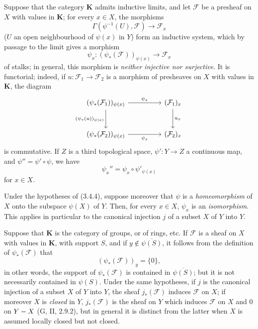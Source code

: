 \begin{env}[3.4.4]
\label{0.3.4.4}
Suppose that the category $\boldsymbol{K}$ admits inductive limits, and let
$\mathcal{F}$ be a presheaf on $X$ with values in $\boldsymbol{K}$; for every
$x\in X$, the morphisms
\[
  \Gamma(\psi^{-1}(U),\mathcal{F})\to\mathcal{F}_x
\]
($U$ an open neighbourhood of $\psi(x)$ in $Y$) form an inductive system, which
by passage
to the limit gives a morphism
\[
  \psi_x:(\psi_*(\mathcal{F}))_{\psi(x)}\to\mathcal{F}_x
\]
of stalks; in general, this morphism is \emph{neither injective nor surjective}.
It is functorial; indeed, if
$u:\mathcal{F}_1\to\mathcal{F}_2$ is a morphism of presheaves on $X$ with
values in $\boldsymbol{K}$, the diagram
\[
\begin{tikzcd}[column sep=huge,row sep=large]
(\psi_*(\mathcal{F}_1))_{\psi(x)}
  \arrow[r,"\psi_x"] \arrow[d,"{(\psi_*(u))_{\psi(x)}}"']
  & (\mathcal{F}_1)_x \arrow[d,"u_x"] \\
(\psi_*(\mathcal{F}_2))_{\psi(x)}
  \arrow[r,"\psi_x"']
  & (\mathcal{F}_2)_x
\end{tikzcd}
\]
is commutative. If $Z$ is a third topological space,
$\psi':Y\to Z$ a continuous map, and $\psi''=\psi'\circ\psi$, we have
\[
  \psi_x''=\psi_x\circ\psi'_{\psi(x)}
\]
for $x\in X$.
\end{env}

\begin{env}[3.4.5]
\label{0.3.4.5}
Under the hypotheses of (3.4.4), suppose moreover that $\psi$ is a
\emph{homeomorphism} of $X$ onto the subspace $\psi(X)$ of $Y$. Then, for
every $x\in X$, $\psi_x$ is an \emph{isomorphism}. This applies in
particular to the canonical injection $j$ of a subset $X$ of $Y$ into $Y$.
\end{env}

\begin{env}[3.4.6]
\label{0.3.4.6}
Suppose that $\boldsymbol{K}$ is the category of groups, or of rings, etc.
If $\mathcal{F}$ is a sheaf on $X$ with values in $\boldsymbol{K}$, with
support $S$, and if $y\notin\overline{\psi(S)}$, it follows from the definition of
$\psi_*(\mathcal{F})$ that
\[
  (\psi_*(\mathcal{F}))_y=\{0\},
\]
in other words, the support of $\psi_*(\mathcal{F})$ is contained in
$\overline{\psi(S)}$; but it is not necessarily contained in
$\psi(S)$. Under the same hypotheses, if $j$ is the canonical injection of a
subset $X$ of $Y$ into $Y$, the sheaf $j_*(\mathcal{F})$ induces
$\mathcal{F}$ on $X$; if moreover $X$ is \emph{closed} in $Y$,
$j_*(\mathcal{F})$ is the sheaf on $Y$ which induces $\mathcal{F}$ on $X$
and $0$ on $Y- X$ (G, II, 2.9.2), but in general it is distinct from the latter
when $X$ is assumed locally closed but not closed.
\end{env}

